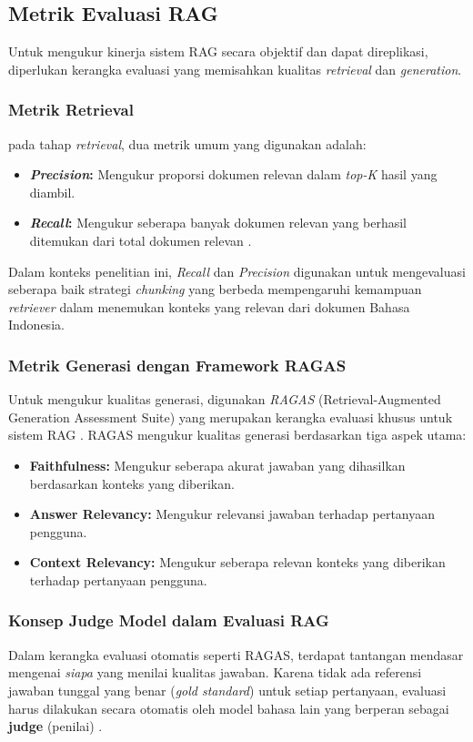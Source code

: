 \subsection{Metrik Evaluasi RAG}
Untuk mengukur kinerja sistem RAG secara objektif dan dapat direplikasi, diperlukan kerangka evaluasi yang memisahkan kualitas \textit{retrieval} dan \textit{generation}.

\subsubsection{Metrik Retrieval}
pada tahap \textit{retrieval}, dua metrik umum yang digunakan adalah:
\begin{itemize}
    \item \textbf{\textit{Precision}:} Mengukur proporsi dokumen relevan dalam \textit{top-K} hasil yang diambil.
    \item \textbf{\textit{Recall}:} Mengukur seberapa banyak dokumen relevan yang berhasil ditemukan dari total dokumen relevan \citep{manning2008ir}.
\end{itemize}

Dalam konteks penelitian ini, \textit{Recall} dan \textit{Precision} digunakan untuk mengevaluasi seberapa baik strategi \textit{chunking} yang berbeda mempengaruhi kemampuan \textit{retriever} dalam menemukan konteks yang relevan dari dokumen Bahasa Indonesia.

\subsubsection{Metrik Generasi dengan Framework RAGAS}
Untuk mengukur kualitas generasi, digunakan \textit{RAGAS} (Retrieval-Augmented Generation Assessment Suite) yang merupakan kerangka evaluasi khusus untuk sistem RAG \citep{es2024ragas}. RAGAS mengukur kualitas generasi berdasarkan tiga aspek utama:

\begin{itemize}
    \item \textbf{Faithfulness:} Mengukur seberapa akurat jawaban yang dihasilkan berdasarkan konteks yang diberikan.
    \item \textbf{Answer Relevancy:} Mengukur relevansi jawaban terhadap pertanyaan pengguna.
    \item \textbf{Context Relevancy:} Mengukur seberapa relevan konteks yang diberikan terhadap pertanyaan pengguna.
\end{itemize}

\subsubsection{Konsep Judge Model dalam Evaluasi RAG}
Dalam kerangka evaluasi otomatis seperti RAGAS, terdapat tantangan mendasar mengenai \textit{siapa} yang menilai kualitas jawaban. Karena tidak ada referensi jawaban tunggal yang benar (\textit{gold standard}) untuk setiap pertanyaan, evaluasi harus dilakukan secara otomatis oleh model bahasa lain yang berperan sebagai \textbf{judge} (penilai) \citep{zheng2023judging}. 

